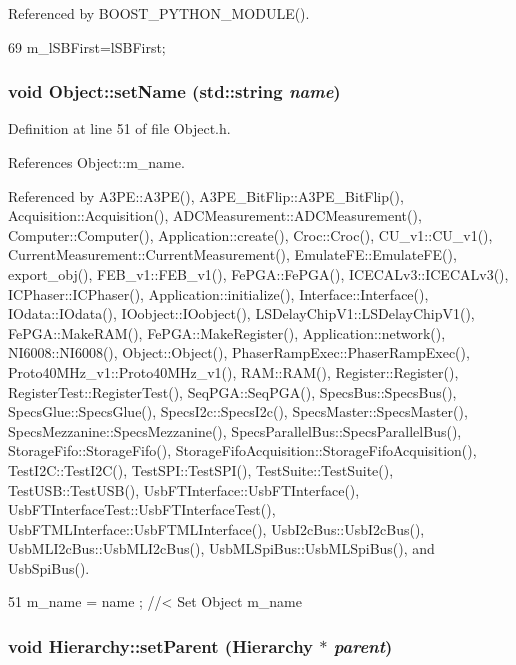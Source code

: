 Referenced by BOOST\_\-PYTHON\_\-MODULE().


\begin{DoxyCode}
69 { m_lSBFirst=lSBFirst; }
\end{DoxyCode}
\hypertarget{classObject_ae30fea75683c2d149b6b6d17c09ecd0c}{
\subsubsection[{setName}]{\setlength{\rightskip}{0pt plus 5cm}void Object::setName (std::string {\em name})}}
\label{classObject_ae30fea75683c2d149b6b6d17c09ecd0c}


Definition at line 51 of file Object.h.

References Object::m\_\-name.

Referenced by A3PE::A3PE(), A3PE\_\-BitFlip::A3PE\_\-BitFlip(), Acquisition::Acquisition(), ADCMeasurement::ADCMeasurement(), Computer::Computer(), Application::create(), Croc::Croc(), CU\_\-v1::CU\_\-v1(), CurrentMeasurement::CurrentMeasurement(), EmulateFE::EmulateFE(), export\_\-obj(), FEB\_\-v1::FEB\_\-v1(), FePGA::FePGA(), ICECALv3::ICECALv3(), ICPhaser::ICPhaser(), Application::initialize(), Interface::Interface(), IOdata::IOdata(), IOobject::IOobject(), LSDelayChipV1::LSDelayChipV1(), FePGA::MakeRAM(), FePGA::MakeRegister(), Application::network(), NI6008::NI6008(), Object::Object(), PhaserRampExec::PhaserRampExec(), Proto40MHz\_\-v1::Proto40MHz\_\-v1(), RAM::RAM(), Register::Register(), RegisterTest::RegisterTest(), SeqPGA::SeqPGA(), SpecsBus::SpecsBus(), SpecsGlue::SpecsGlue(), SpecsI2c::SpecsI2c(), SpecsMaster::SpecsMaster(), SpecsMezzanine::SpecsMezzanine(), SpecsParallelBus::SpecsParallelBus(), StorageFifo::StorageFifo(), StorageFifoAcquisition::StorageFifoAcquisition(), TestI2C::TestI2C(), TestSPI::TestSPI(), TestSuite::TestSuite(), TestUSB::TestUSB(), UsbFTInterface::UsbFTInterface(), UsbFTInterfaceTest::UsbFTInterfaceTest(), UsbFTMLInterface::UsbFTMLInterface(), UsbI2cBus::UsbI2cBus(), UsbMLI2cBus::UsbMLI2cBus(), UsbMLSpiBus::UsbMLSpiBus(), and UsbSpiBus().


\begin{DoxyCode}
51 { m_name  = name  ; } //< Set Object m_name
\end{DoxyCode}
\hypertarget{classHierarchy_a585ad1aeec16077a0e532ab8b4fc557b}{
\subsubsection[{setParent}]{\setlength{\rightskip}{0pt plus 5cm}void Hierarchy::setParent ({\bf Hierarchy} $\ast$ {\em parent})}}
\label{classHierarchy_a585ad1aeec16077a0e532ab8b4fc557b}


